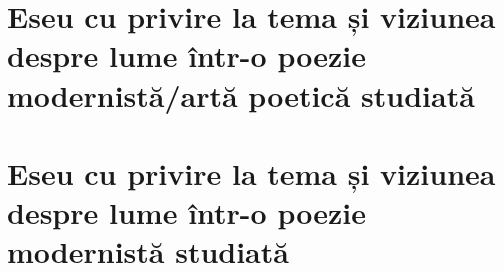 \documentclass[
 12pt,                       %
 a4paper                     %
]{book}
\begin{document}
\chapter{Eseu cu privire la tema și viziunea despre lume într-o poezie modernistă/artă poetică studiată}



\chapter{Eseu cu privire la tema și viziunea despre lume într-o poezie modernistă studiată}

\end{document}
